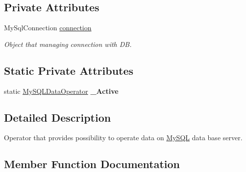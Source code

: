 \subsection*{Private Attributes}
\begin{DoxyCompactItemize}
\item 
My\+Sql\+Connection \mbox{\hyperlink{class_uniform_data_operator_1_1_s_q_l_1_1_my_s_q_l_1_1_my_s_q_l_data_operator_acdc80f644c1a4bc7d8cf71705d513aff}{connection}}
\begin{DoxyCompactList}\small\item\em Object that managing connection with DB. \end{DoxyCompactList}\end{DoxyCompactItemize}
\subsection*{Static Private Attributes}
\begin{DoxyCompactItemize}
\item 
\mbox{\label{class_uniform_data_operator_1_1_s_q_l_1_1_my_s_q_l_1_1_my_s_q_l_data_operator_a006ae5b7a455a4409ab7e9551ad6d33c}} 
static \mbox{\hyperlink{class_uniform_data_operator_1_1_s_q_l_1_1_my_s_q_l_1_1_my_s_q_l_data_operator}{My\+S\+Q\+L\+Data\+Operator}} {\bfseries \+\_\+\+Active}
\end{DoxyCompactItemize}


\subsection{Detailed Description}
Operator that provides possibility to operate data on \mbox{\hyperlink{namespace_uniform_data_operator_1_1_s_q_l_1_1_my_s_q_l}{My\+S\+QL}} data base server. 



\subsection{Member Function Documentation}
\mbox{\label{class_uniform_data_operator_1_1_s_q_l_1_1_my_s_q_l_1_1_my_s_q_l_data_operator_a3684b6d5abbcde94880ef433a8ffb28f}} 
